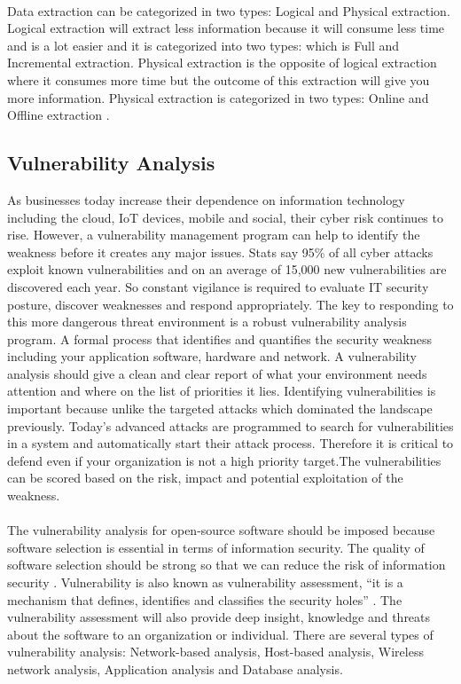 \paragraph{}
Data extraction can be categorized in two types: Logical and Physical extraction. Logical extraction will extract less information because it will consume less time and is a lot easier and it is categorized into two types: which is Full and Incremental extraction. Physical extraction is the opposite of logical extraction where it consumes more time but the outcome of this extraction will give you more information. Physical extraction is categorized in two types: Online and Offline extraction \cite{DataWH}.
%
\subsection{Vulnerability Analysis}
As businesses today increase their dependence on information technology including the cloud, IoT devices, mobile and social, their cyber risk continues to rise. However, a vulnerability management program can help to identify the weakness before it creates any major issues. Stats say 95\% of all cyber attacks exploit known vulnerabilities and on an average of 15,000 new vulnerabilities are discovered each year\cite{Rh2019}. So constant vigilance is required to evaluate IT security posture, discover weaknesses and respond appropriately. The key to responding to this more dangerous threat environment is a robust vulnerability analysis program. A formal process that identifies and quantifies the security weakness including your application software, hardware and network. A vulnerability analysis should give a clean and clear report of what your environment needs attention and where on the list of priorities it lies. Identifying vulnerabilities is important  because unlike the targeted attacks which dominated the landscape previously. Today’s advanced attacks are programmed to search for vulnerabilities in a system and automatically start their attack process. Therefore it is critical to defend even if your organization is not a high priority target.The vulnerabilities can be scored based on the risk, impact and potential exploitation of the weakness.
\paragraph{}
The vulnerability analysis for open-source software should be imposed because software selection is essential in terms of information security. The quality of software selection should be strong so that we can reduce the risk of information security \cite{KeJaSa2005}. Vulnerability is also known as vulnerability assessment, “it is a mechanism that defines, identifies and classifies the security holes” \cite{KeJaSa2005}. The vulnerability assessment will also provide deep insight, knowledge and threats about the software to an organization or individual. There are several types of vulnerability analysis: Network-based analysis, Host-based analysis, Wireless network analysis, Application analysis and Database analysis.
